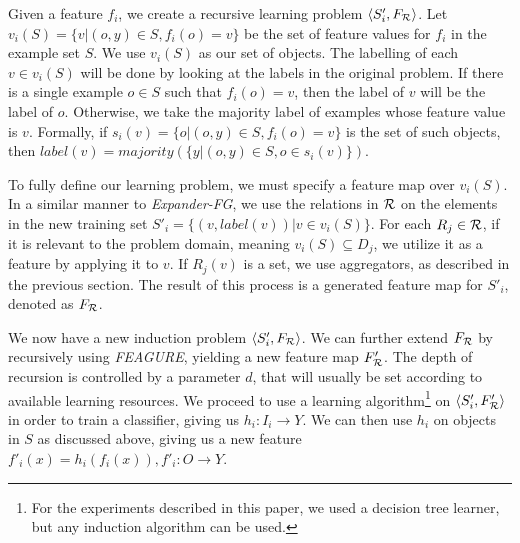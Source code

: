 \documentclass[twoside,11pt]{article}
\theoremstyle{definition}
\begin{document}

Given a feature $f_{i}$, we create a recursive learning problem $\langle S'_i,F_{\cal R} \rangle$. %
 Let $v_i(S) = \{v | (o,y) \in S, f_{i}(o)=v\}$ be the set of feature values for $f_i$ in the example set $S$. %
We use $v_i(S)$ as our set of objects. The labelling of each $v \in v_i(S)$ will be done by looking at the labels in the original problem.
 If there is a single example $o \in S$ such that $f_i(o)=v$, then the label of $v$ will be the label of $o$. Otherwise, we take the majority label of examples whose feature value is $v$. Formally, if $s_i(v)=\{o | (o,y)\in S, f_{i}(o)=v\}$ is the set of such objects, then $label(v)=majority(\{y|(o,y)\in S, o\in s_i(v)\})$.

To fully define our learning problem, we must specify a feature map over $v_i(S)$. In a similar manner to \emph{Expander-FG}, we use the relations in ${\cal R}$ on the elements in the new training set $S'_i = \{ (v, label(v)) | v \in v_i(S) \}$.
For each $R_j\in {\cal R}$, if it is relevant to the problem domain, meaning $v_i(S)\subseteq D_j$, we utilize it as a feature by applying it to $v$. If $R_j(v)$ is a set, we use aggregators, as described in the previous section. 
The result of this process is a generated feature map for $S'_i$, denoted as $F_{\cal R}$. 

We now have a new induction problem $\langle S'_i,F_{\cal R} \rangle$.
We can further extend $F_{\cal R}$ by recursively using \emph{FEAGURE}, yielding a new feature map $F'_{\cal R}$. The depth of recursion is controlled by a parameter $d$, that will usually be set according to available learning resources.
We proceed to use a learning algorithm\footnote{For the experiments described in this paper, we used a decision tree learner, but any induction algorithm can be used.} on $\langle S'_i,F'_{\cal R} \rangle$ in order to train a classifier, giving us $h_i:I_i\rightarrow Y$. We can then use $h_i$ on objects in $S$ as discussed above, giving us a new feature $f'_{i}(x)=h_{i}(f_{i}(x)), f'_{i}:O\rightarrow Y$. 
\end{document}
